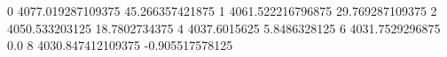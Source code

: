 0 4077.019287109375 45.266357421875
1 4061.522216796875 29.769287109375
2 4050.533203125 18.7802734375
4 4037.6015625 5.8486328125
6 4031.7529296875 0.0
8 4030.847412109375 -0.905517578125
